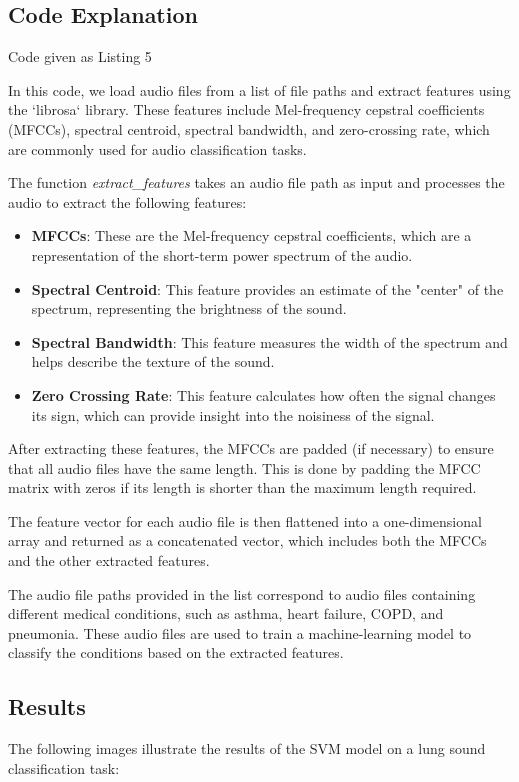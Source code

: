 \documentclass[conference]{IEEEtran}
\begin{document}
\subsection{Code Explanation}
Code given as Listing 5

In this code, we load audio files from a list of file paths and extract features using the `librosa` library. These features include Mel-frequency cepstral coefficients (MFCCs), spectral centroid, spectral bandwidth, and zero-crossing rate, which are commonly used for audio classification tasks.

The function \textit{extract\_features} takes an audio file path as input and processes the audio to extract the following features:
\begin{itemize}
    \item \textbf{MFCCs}: These are the Mel-frequency cepstral coefficients, which are a representation of the short-term power spectrum of the audio.
    \item \textbf{Spectral Centroid}: This feature provides an estimate of the "center" of the spectrum, representing the brightness of the sound.
    \item \textbf{Spectral Bandwidth}: This feature measures the width of the spectrum and helps describe the texture of the sound.
    \item \textbf{Zero Crossing Rate}: This feature calculates how often the signal changes its sign, which can provide insight into the noisiness of the signal.
\end{itemize}

After extracting these features, the MFCCs are padded (if necessary) to ensure that all audio files have the same length. This is done by padding the MFCC matrix with zeros if its length is shorter than the maximum length required.

The feature vector for each audio file is then flattened into a one-dimensional array and returned as a concatenated vector, which includes both the MFCCs and the other extracted features.

The audio file paths provided in the list correspond to audio files containing different medical conditions, such as asthma, heart failure, COPD, and pneumonia. These audio files are used to train a machine-learning model to classify the conditions based on the extracted features.


\subsection{Results}
The following images illustrate the results of the SVM model on a lung sound classification task:
\end{document}
